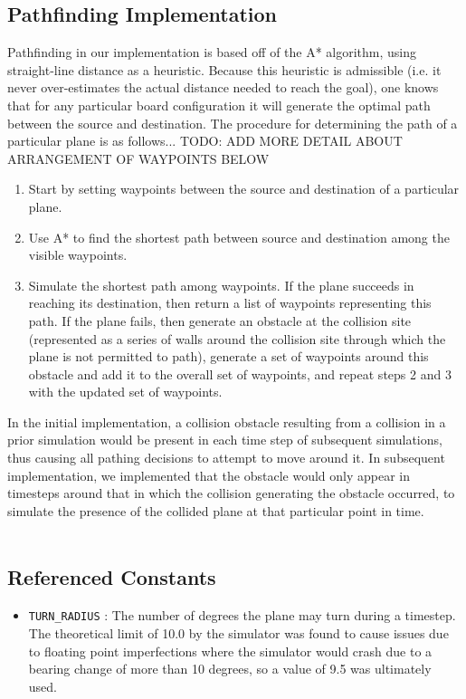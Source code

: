 \documentclass[10pt]{article}
\newcommand{\ms}[1] {
  \texttt{#1}
}
\begin{document}
\subsection{Pathfinding Implementation}
Pathfinding in our implementation is based off of the A* algorithm, using straight-line distance as a
heuristic. Because this heuristic is admissible (i.e. it never over-estimates the actual distance needed
to reach the goal), one knows that for any particular board configuration it will generate the optimal
path between the source and destination. The procedure for determining the path of a particular plane is as follows...
TODO: ADD MORE DETAIL ABOUT ARRANGEMENT OF WAYPOINTS BELOW
\begin{enumerate}
  \item Start by setting waypoints between the source and destination of a particular plane.
  \item Use A* to find the shortest path between source and destination among the visible waypoints.
  \item Simulate the shortest path among waypoints. If the plane succeeds in reaching its destination,
    then return a list of waypoints representing this path. If the plane fails, then generate an obstacle
    at the collision site (represented as a series of walls around the collision site through which the
    plane is not permitted to path), generate a set of waypoints around this obstacle and add it to the
    overall set of waypoints, and repeat steps 2 and 3 with the updated set of waypoints.
\end{enumerate}
In the initial implementation, a collision obstacle resulting from a collision in a prior simulation would
be present in each time step of subsequent simulations, thus causing all pathing decisions to attempt to
move around it. In subsequent implementation, we implemented that the obstacle would only appear in timesteps
around that in which the collision generating the obstacle occurred, to simulate the presence of the collided
plane at that particular point in time.\\\\

\subsection{Referenced Constants}
\begin{itemize}
  \item \ms{TURN\_RADIUS}: The number of degrees the plane may turn during a timestep. The theoretical limit of 
    10.0 by the simulator was found to cause issues due to floating point imperfections where the simulator would
    crash due to a bearing change of more than 10 degrees, so a value of 9.5 was ultimately used.
\end{itemize}
\end{document}
